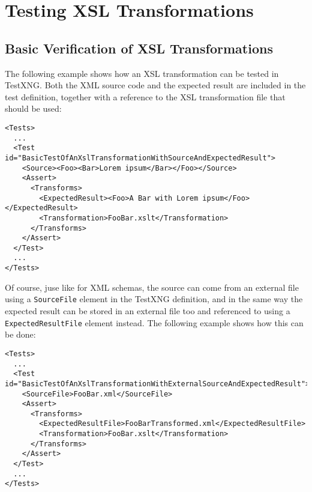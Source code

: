 %

\chapter{Testing XSL Transformations}

\section{Basic Verification of XSL Transformations}

The following example shows how an XSL transformation can be tested in TestXNG. Both the XML source code and the expected result are included in the test definition, together with a reference to the XSL transformation file that should be used:
\begin{verbatim}
<Tests>
  ...
  <Test id="BasicTestOfAnXslTransformationWithSourceAndExpectedResult">
    <Source><Foo><Bar>Lorem ipsum</Bar></Foo></Source>
    <Assert>
      <Transforms>
        <ExpectedResult><Foo>A Bar with Lorem ipsum</Foo></ExpectedResult>
        <Transformation>FooBar.xslt</Transformation>
      </Transforms>
    </Assert>    
  </Test>
  ...
</Tests>
\end{verbatim}

Of course, juse like for XML schemas, the source can come from an external file using a {\tt SourceFile} element in the TestXNG definition, and in the same way the expected result can be stored in an external file too and referenced to using a {\tt ExpectedResultFile} element instead. The following example shows how this can be done:
\begin{verbatim}
<Tests>
  ...
  <Test id="BasicTestOfAnXslTransformationWithExternalSourceAndExpectedResult">
    <SourceFile>FooBar.xml</SourceFile>
    <Assert>
      <Transforms>
        <ExpectedResultFile>FooBarTransformed.xml</ExpectedResultFile>
        <Transformation>FooBar.xslt</Transformation>
      </Transforms>
    </Assert>    
  </Test>
  ...
</Tests>
\end{verbatim}

